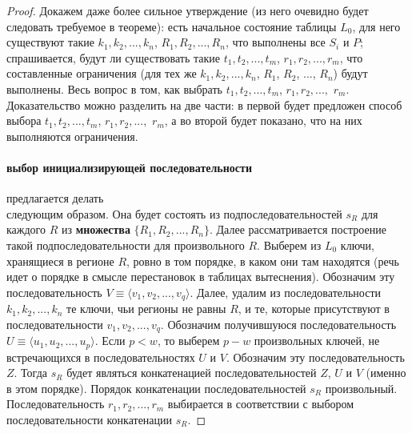 \theoremtext{\ref{mirror_fullness}}{\FullnessMirror}
\begin{proof}
Докажем даже более сильное утверждение (из него очевидно будет следовать требуемое в теореме): есть начальное состояние таблицы $L_0$, для него существуют такие $k_1, k_2, ..., k_n$, $R_1, R_2, ..., R_n$, что выполнены все $S_i$ и $P$; спрашивается, будут ли существовать такие $t_1, t_2, ..., t_m$, $r_1, r_2, ..., r_m$, что составленные ограничения (для тех же $k_1, k_2, ..., k_n$, $R_1$, $R_2$, ..., $R_n$) будут выполнены. Весь вопрос в том, как выбрать $t_1, t_2, ..., t_m$, $r_1, r_2, ...,$ $r_m$. Доказательство можно разделить на две части: в первой будет предложен способ выбора $t_1, t_2, ..., t_m$, $r_1, r_2, ...,$ $r_m$, а во второй будет показано, что на них выполняются ограничения.

\paragraph{выбор инициализирующей последовательности} предлагается делать\\следующим образом. Она будет состоять из подпоследовательностей $s_R$ для каждого $R$ из \textbf{множества} $\{R_1, R_2, ..., R_n\}$. Далее рассматривается построение такой подпоследовательности для произвольного $R$. Выберем из $L_0$ ключи, хранящиеся в регионе $R$, ровно в том порядке, в каком они там находятся (речь идет о порядке в смысле перестановок в таблицах вытеснения). Обозначим эту последовательность $V \equiv \langle v_1, v_2, ..., v_q \rangle$. Далее, удалим из последовательности $k_1, k_2, ..., k_n$ те ключи, чьи регионы не равны $R$, и те, которые присутствуют в последовательности $v_1, v_2, ..., v_q$. Обозначим получившуюся последовательность $U \equiv \langle u_1, u_2, ..., u_p\rangle$. Если $p < w$, то выберем $p{-}w$ произвольных ключей, не встречающихся в последовательностях $U$ и $V$. Обозначим эту последовательность $Z$. Тогда $s_R$ будет являться конкатенацией последовательностей $Z$, $U$ и $V$ (именно в этом порядке). Порядок конкатенации последовательностей $s_R$ произвольный. Последовательность $r_1, r_2, ..., r_m$ выбирается в соответствии с выбором последовательности конкатенации $s_R$.


\end{proof}
